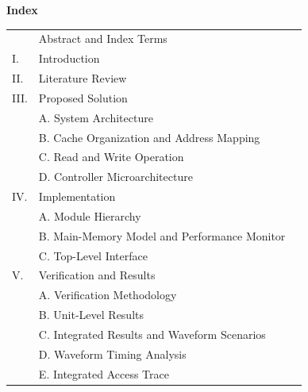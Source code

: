 \documentclass[conference,a4paper]{IEEEtran}
\begin{document}
\pagestyle{plain}
\begin{center}{\Large\bfseries Index}\end{center}
\vspace{0.1cm}
\renewcommand{\arraystretch}{1.0}
\small
\noindent\begin{tabular}{@{}p{1.2cm}p{12cm}r@{}}
 & Abstract and Index Terms & \pageref{sec:abs}\\
I. & Introduction & \pageref{sec:intro}\\
II. & Literature Review & \pageref{sec:lit}\\
III. & Proposed Solution & \pageref{sec:sol}\\
 & \hspace{1em}A. System Architecture & \pageref{sec:arch}\\
 & \hspace{1em}B. Cache Organization and Address Mapping & \pageref{sec:map}\\
 & \hspace{1em}C. Read and Write Operation & \pageref{sec:rw}\\
 & \hspace{1em}D. Controller Microarchitecture & \pageref{sec:fsm}\\
IV. & Implementation & \pageref{sec:impl}\\
 & \hspace{1em}A. Module Hierarchy & \pageref{sec:mods}\\
 & \hspace{1em}B. Main-Memory Model and Performance Monitor & \pageref{sec:memmon}\\
 & \hspace{1em}C. Top-Level Interface & \pageref{sec:iface}\\
V. & Verification and Results & \pageref{sec:ver}\\
 & \hspace{1em}A. Verification Methodology & \pageref{sec:meth}\\
 & \hspace{1em}B. Unit-Level Results & \pageref{sec:unit}\\
 & \hspace{1em}C. Integrated Results and Waveform Scenarios & \pageref{sec:integ}\\
 & \hspace{1em}D. Waveform Timing Analysis & \pageref{sec:wave}\\
 & \hspace{1em}E. Integrated Access Trace & \pageref{sec:trace}\\

\end{tabular}
\end{document}
